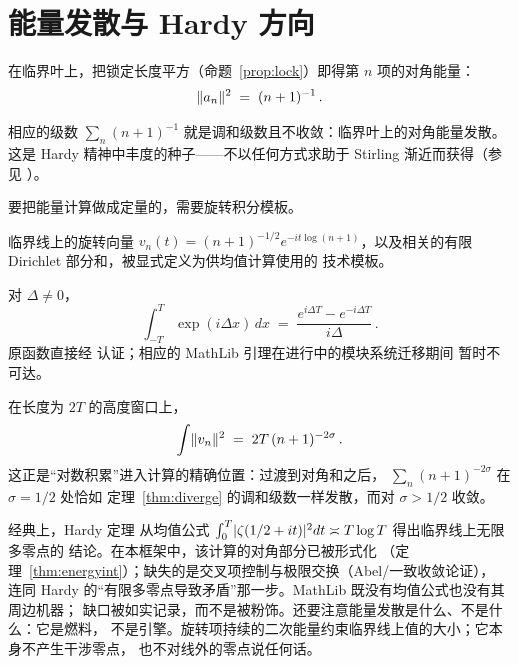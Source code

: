 \section{能量发散与 Hardy 方向}\label{sec:energy}

\begin{proposition}\label{prop:diagterm}
在临界叶上，把锁定长度平方（命题~\ref{prop:lock}）即得第 $n$ 项的对角能量：
\[
  \lVert a_n\rVert^{2} \;=\; (n+1)^{-1}\, .
\]
\end{proposition}

\begin{theorem}
\label{thm:diverge}
相应的级数 $\sum_n (n+1)^{-1}$ 就是调和级数且不收敛：临界叶上的对角能量发散。
这是 Hardy 精神中丰度的种子——不以任何方式求助于 Stirling
渐近而获得（参见 \citet{Hardy1914}）。
\end{theorem}

要把能量计算做成定量的，需要旋转积分模板。

\begin{definition}
\label{def:template}
临界线上的旋转向量 $v_n(t)=(n+1)^{-1/2}
e^{-it\log(n+1)}$，以及相关的有限 Dirichlet 部分和，被显式定义为供均值计算使用的
技术模板。
\end{definition}

\begin{proposition}\label{prop:intatom}
对 $\Delta\neq 0$，
\[
  \int_{-T}^{T} \exp(i\Delta x)\,dx
  \;=\; \frac{e^{i\Delta T}-e^{-i\Delta T}}{i\Delta}\, .
\]
原函数直接经  认证；相应的 MathLib 引理在进行中的模块系统迁移期间
暂时不可达。
\end{proposition}

\begin{theorem}\label{thm:energyint}
在长度为 $2T$ 的高度窗口上，
\[
  \int \lVert v_n\rVert^{2} \;=\; 2T\,(n+1)^{-2\sigma}\, .
\]
这正是“对数积累”进入计算的精确位置：过渡到对角和之后，
$\sum_{n}(n+1)^{-2\sigma}$ 在 $\sigma=1/2$ 处恰如
定理~\ref{thm:diverge} 的调和级数一样发散，而对 $\sigma>1/2$ 收敛。
\end{theorem}

\begin{remark}[均值公式缺口]\label{remark:mean}
经典上，Hardy 定理 \citep{Hardy1914} 从均值公式
$\int_{0}^{T}\lvert \zeta(1/2+it)\rvert^{2}dt\asymp T\log T$ 得出临界线上无限多零点的
结论。在本框架中，该计算的对角部分已被形式化
（定理~\ref{thm:energyint}）；缺失的是交叉项控制与极限交换（Abel/一致收敛论证），
连同 Hardy 的“有限多零点导致矛盾”那一步。MathLib 既没有均值公式也没有其周边机器；
缺口被如实记录，而不是被粉饰。还要注意能量发散是什么、不是什么：它是燃料，
不是引擎。旋转项持续的二次能量约束临界线上值的大小；它本身不产生干涉零点，
也不对线外的零点说任何话。
\end{remark}

